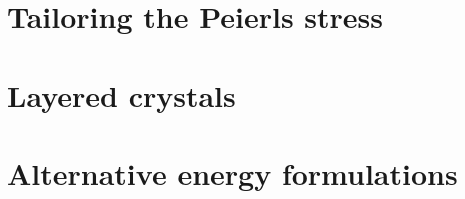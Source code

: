 



\section{Tailoring the Peierls stress}
\label{sec:tailor_peierls}




\section{Layered crystals}
\label{sec:layered_crystals}



\section{Alternative energy formulations}

\label{sec:empirical_potentials}


























































































